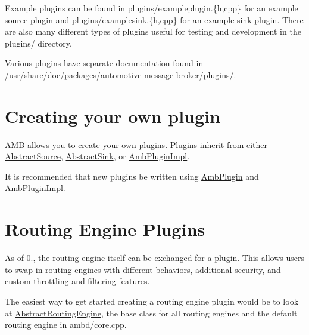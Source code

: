 Example plugins can be found in plugins/exampleplugin.\{h,cpp\} for an example source plugin and plugins/examplesink.\{h,cpp\} for an example sink plugin. There are also many different types of plugins useful for testing and development in the plugins/ directory.

Various plugins have separate documentation found in /usr/share/doc/packages/automotive-\/message-\/broker/plugins/.\hypertarget{index_plugin_creation}{}\section{Creating your own plugin}\label{index_plugin_creation}
A\+M\+B allows you to create your own plugins. Plugins inherit from either \hyperlink{classAbstractSource}{Abstract\+Source}, \hyperlink{classAbstractSink}{Abstract\+Sink}, or \hyperlink{classAmbPluginImpl}{Amb\+Plugin\+Impl}.

It is recommended that new plugins be written using \hyperlink{classAmbPlugin}{Amb\+Plugin} and \hyperlink{classAmbPluginImpl}{Amb\+Plugin\+Impl}.\hypertarget{index_routing_engine}{}\section{Routing Engine Plugins}\label{index_routing_engine}
As of 0., the routing engine itself can be exchanged for a plugin. This allows users to swap in routing engines with different behaviors, additional security, and custom throttling and filtering features.

The easiest way to get started creating a routing engine plugin would be to look at \hyperlink{classAbstractRoutingEngine}{Abstract\+Routing\+Engine}, the base class for all routing engines and the default routing engine in ambd/core.\+cpp. 